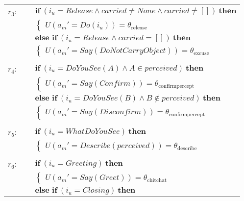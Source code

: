 \begin{footnotesize}
\begin{longtable}{p{2cm}l}
$r_{3}$: \ \ & $ \textbf{if} \ (\mathit{i_u}\!=\!\mathit{Release} \land \mathit{carried}\!\neq\!\mathit{None} \land \mathit{carried}\!\neq\!\mathit{[]}) \ \textbf{then} $ \\
 & \;\;\;\;\; $ \begin{cases}U(\mathit{a_m}'\!=\!\mathit{Do({i_u})})\!=\!\theta_{\mathrm{release}} \end{cases}$ \vspace{1mm} \\ & $ \textbf{else if} \ (\mathit{i_u}\!=\!\mathit{Release} \land \mathit{carried}\!=\!\mathit{[]}) \ \textbf{then}$ \\
& \;\;\;\;\; $ \begin{cases}U(\mathit{a_m}'\!=\!\mathit{Say(DoNotCarryObject)})\!=\!\theta_{\mathrm{excuse}} \end{cases}$ \\ \\[-1mm]
$r_{4}$: \ \ & $ \textbf{if} \ (\mathit{i_u}\!=\!\mathit{DoYouSee({A})} \land \mathit{{A}}\!\in\!\mathit{perceived}) \ \textbf{then} $ \\
 & \;\;\;\;\; $ \begin{cases}U(\mathit{a_m}'\!=\!\mathit{Say(Confirm)})\!=\!\theta_{\mathrm{confirmpercept}} \end{cases}$ \vspace{1mm} \\ & $ \textbf{else if} \ (\mathit{i_u}\!=\!\mathit{DoYouSee({B})} \land \mathit{{B}}\!\notin\!\mathit{perceived}) \ \textbf{then}$ \\
& \;\;\;\;\; $ \begin{cases}U(\mathit{a_m}'\!=\!\mathit{Say(Disconfirm)})\!=\!\theta_{\mathrm{confirmpercept}} \end{cases}$ \\ \\[-1mm]
$r_{5}$: \ \ & $ \textbf{if} \ (\mathit{i_u}\!=\!\mathit{WhatDoYouSee}) \ \textbf{then} $ \\
 & \;\;\;\;\; $ \begin{cases}U(\mathit{a_m}'\!=\!\mathit{Describe({perceived})})\!=\!\theta_{\mathrm{describe}} \end{cases}$ \\ \\[-1mm]
$r_{6}$: \ \ & $ \textbf{if} \ (\mathit{i_u}\!=\!\mathit{Greeting}) \ \textbf{then} $ \\
 & \;\;\;\;\; $ \begin{cases}U(\mathit{a_m}'\!=\!\mathit{Say(Greet)})\!=\!\theta_{\mathrm{chitchat}} \end{cases}$ \vspace{1mm} \\ & $ \textbf{else if} \ (\mathit{i_u}\!=\!\mathit{Closing}) \ \textbf{then}$ \\

\end{longtable}
\end{footnotesize}
